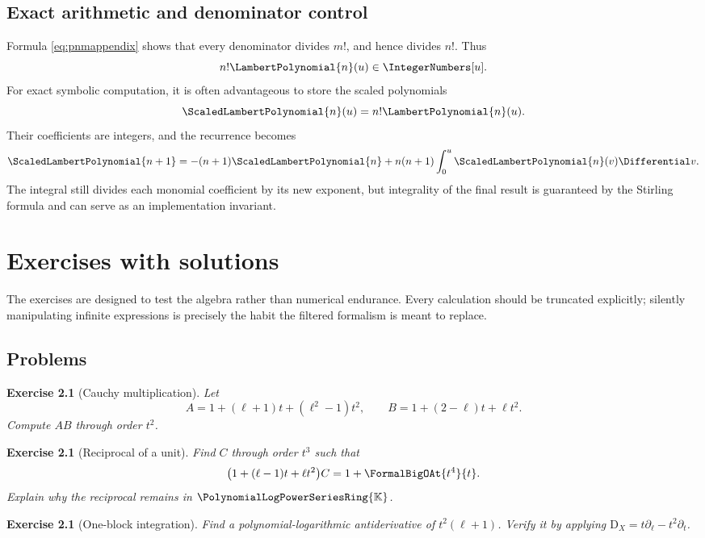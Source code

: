\documentclass[11pt,oneside,openany]{book}
\newtheorem{exercise}[theorem]{Exercise}
\newcommand{\K}{\mathbb{K}}
\newcommand{\Rring}{\PolynomialLogPowerSeriesRing{\K}}
\newcommand{\D}{\mathrm{D}}
\begin{document}
\section{Exact arithmetic and denominator control}
Formula \cref{eq:pnmappendix} shows that every denominator divides \(m!\),
and hence divides \(n!\).  Thus
\[
 n!\LambertPolynomial{n}(u)\in\IntegerNumbers[u].
\]
For exact symbolic computation, it is often advantageous to store the scaled
polynomials
\[
 \ScaledLambertPolynomial{n}(u)=n!\LambertPolynomial{n}(u).
\]
Their coefficients are integers, and the recurrence becomes
\begin{equation}\label{eq:scaledPrec}
 \ScaledLambertPolynomial{n+1}
 =-(n+1)\ScaledLambertPolynomial{n}
   +n(n+1)\int_0^u\ScaledLambertPolynomial{n}(v)\Differential v.
\end{equation}
The integral still divides each monomial coefficient by its new exponent, but
integrality of the final result is guaranteed by the Stirling formula and can
serve as an implementation invariant.


\chapter{Exercises with solutions}
\label{app:exercises}

The exercises are designed to test the algebra rather than numerical
endurance.  Every calculation should be truncated explicitly; silently
manipulating infinite expressions is precisely the habit the filtered formalism
is meant to replace.

\section{Problems}

\begin{exercise}[Cauchy multiplication]
Let
\[
 A=1+(\ell+1)t+(\ell^2-1)t^2,
 \qquad
 B=1+(2-\ell)t+\ell t^2.
\]
Compute \(AB\) through order \(t^2\).
\end{exercise}

\begin{exercise}[Reciprocal of a unit]
Find \(C\) through order \(t^3\) such that
\[
 \bigl(1+(\ell-1)t+\ell t^2\bigr)C=1+\FormalBigOAt{t^4}{t}.
\]
Explain why the reciprocal remains in \(\Rring\).
\end{exercise}

\begin{exercise}[One-block integration]
Find a polynomial-logarithmic antiderivative of
\(t^2(\ell+1)\).  Verify it by applying
\(\D_X=t\partial_\ell-t^2\partial_t\).
\end{exercise}
\end{document}
